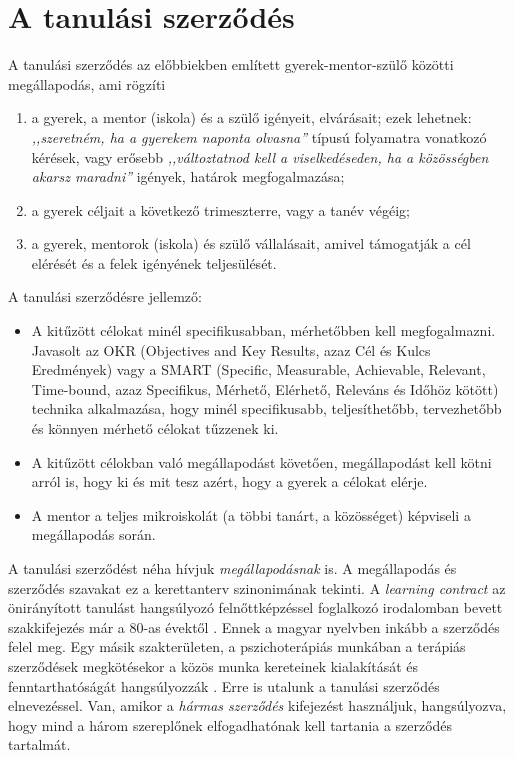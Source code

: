 \section{A tanulási szerződés}

A tanulási szerződés az előbbiekben említett gyerek-mentor-szülő közötti megállapodás, ami rögzíti
\begin{enumerate}
      \item a gyerek, a mentor (iskola) és a szülő igényeit, elvárásait;\hfill\break
 ezek lehetnek: \emph{,,szeretném, ha a gyerekem naponta olvasna''} típusú folyamatra vonatkozó kérések, vagy erősebb \emph{,,változtatnod       kell a viselkedéseden, ha a közösségben akarsz maradni''} igények, határok megfogalmazása;

      \item a gyerek céljait a következő trimeszterre, vagy a tanév végéig;

      \item a gyerek, mentorok (iskola) és szülő vállalásait, amivel támogatják a cél elérését és a felek igényének teljesülését.

\end{enumerate}

A tanulási szerződésre jellemző:
\begin{itemize}
      \item A kitűzött célokat minél specifikusabban, mérhetőbben kell megfogalmazni. Javasolt az OKR  (Objectives and Key Results, azaz	Cél és Kulcs Eredmények) \citep{okr} vagy a SMART (Specific, Measurable, Achievable, Relevant, Time-bound, azaz Specifikus,  Mérhető, Elérhető, Releváns és Időhöz kötött) \citep{wiki:smart} technika alkalmazása, hogy minél specifikusabb, teljesíthetőbb, tervezhetőbb és könnyen mérhető célokat tűzzenek ki.

      \item A kitűzött célokban való megállapodást követően, megállapodást kell kötni arról is, hogy ki és mit tesz azért, hogy a gyerek a célokat elérje.

      \item A mentor a teljes mikroiskolát (a többi tanárt, a közösséget) képviseli a megállapodás során.
\end{itemize}

A tanulási szerződést néha hívjuk \emph{megállapodásnak} is. A megállapodás és szerződés szavakat ez a kerettanterv szinonimának tekinti. A \emph{learn\-ing con\-tract} az önirányított tanulást hangsúlyozó felnőttképzéssel foglalkozó irodalomban bevett szakkifejezés már a 80-as évektől \citep{Malcolm77}. Ennek a magyar nyelvben inkább a szerződés felel meg. Egy másik szakterületen, a pszichoterápiás munkában a terápiás szerződések megkötésekor a közös munka kereteinek kialakítását és fenntarthatóságát hangsúlyozzák \citep{pszichoterapia}. Erre is utalunk a tanulási szerződés elnevezéssel. Van, amikor a \emph{hármas szerződés} kifejezést használjuk, hangsúlyozva, hogy mind a három szereplőnek elfogadhatónak kell tartania a szerződés tartalmát.
